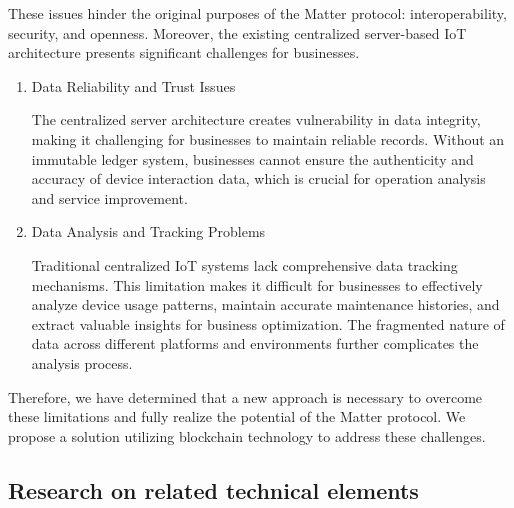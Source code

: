 \documentclass[conference]{IEEEtran}
\begin{document}
These issues hinder the original purposes of the Matter protocol: interoperability,
security, and openness. Moreover, the existing centralized server-based IoT architecture
presents significant challenges for businesses.

\begin{enumerate}[itemsep=2ex, parsep=1ex]
	\item Data Reliability and Trust Issues
	      	      
	      The centralized server architecture creates vulnerability in data
	      integrity, making it challenging for businesses to maintain reliable records.
	      Without an immutable ledger system, businesses cannot ensure the authenticity
	      and accuracy of device interaction data, which is crucial for operation
	      analysis and service improvement.
	      	      
	\item Data Analysis and Tracking Problems
	      	      
	      Traditional centralized IoT systems lack comprehensive data tracking
	      mechanisms. This limitation makes it difficult for businesses to effectively
	      analyze device usage patterns, maintain accurate maintenance histories, and
	      extract valuable insights for business optimization. The fragmented nature
	      of data across different platforms and environments further complicates
	      the analysis process.
\end{enumerate}

Therefore, we have determined that a new approach is necessary to overcome these
limitations and fully realize the potential of the Matter protocol. We propose
a solution utilizing blockchain technology to address these challenges.

\subsection{Research on related technical elements}
\end{document}
